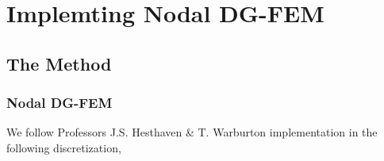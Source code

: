 \section{Implemting Nodal DG-FEM}
\subsection{The Method}

\begin{frame}
	\frametitle{Nodal DG-FEM}
	We follow Professors J.S. Hesthaven \& T. Warburton implementation \cite{Hesthaven:2010:NDG:1952159} in the following discretization,
	
\end{frame}
